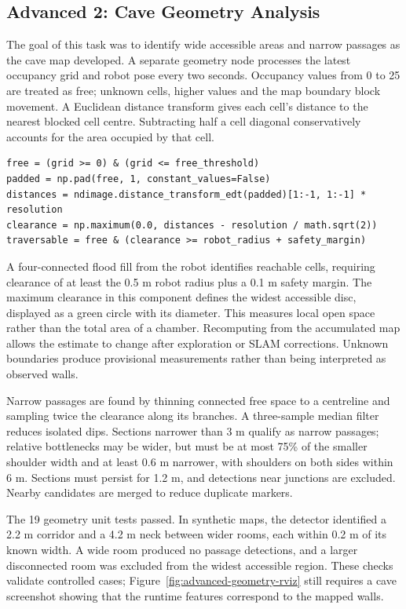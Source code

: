 \documentclass[a4paper,11pt]{article}
\begin{document}
\subsection{Advanced 2: Cave Geometry Analysis}
The goal of this task was to identify wide accessible areas and narrow passages
as the cave map developed. A separate geometry node processes the latest
occupancy grid and robot pose every two seconds. Occupancy values from 0 to 25
are treated as free; unknown cells, higher values and the map boundary block
movement. A Euclidean distance transform gives each cell's distance to the nearest
blocked cell centre. Subtracting half a cell diagonal conservatively accounts
for the area occupied by that cell.

\begin{lstlisting}[caption={Conservative clearance and traversability calculation}, label={lst:advanced-clearance}]
free = (grid >= 0) & (grid <= free_threshold)
padded = np.pad(free, 1, constant_values=False)
distances = ndimage.distance_transform_edt(padded)[1:-1, 1:-1] * resolution
clearance = np.maximum(0.0, distances - resolution / math.sqrt(2))
traversable = free & (clearance >= robot_radius + safety_margin)
\end{lstlisting}

A four-connected flood fill from the robot identifies reachable cells, requiring
clearance of at least the 0.5 m robot radius plus a 0.1 m safety margin. The
maximum clearance in this component defines the widest accessible disc, displayed
as a green circle with its diameter. This measures local open space rather than
the total area of a chamber. Recomputing from the accumulated map allows the
estimate to change after exploration or SLAM corrections. Unknown boundaries
produce provisional measurements rather than being interpreted as observed walls.

Narrow passages are found by thinning connected free space to a centreline and
sampling twice the clearance along its branches. A three-sample median filter
reduces isolated dips. Sections narrower than 3 m qualify as narrow passages;
relative bottlenecks may be wider, but must be at most 75\% of the smaller
shoulder width and at least 0.6 m narrower, with shoulders on both sides within
6 m. Sections must persist for 1.2 m, and detections near junctions are excluded.
Nearby candidates are merged to reduce duplicate markers.

The 19 geometry unit tests passed. In synthetic maps, the detector identified
a 2.2 m corridor and a 4.2 m neck between wider rooms, each within 0.2 m of its
known width. A wide room produced no passage detections, and a larger disconnected
room was excluded from the widest accessible region. These checks validate
controlled cases; Figure~\ref{fig:advanced-geometry-rviz} still requires a cave
screenshot showing that the runtime features correspond to the mapped walls.
\end{document}
